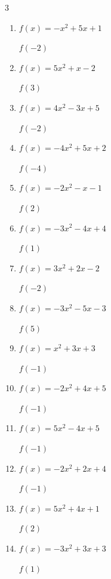 \begin{multicols}{3}
\begin{enumerate}
  \item $f(x)=-x^{2}+5x+1$

$f(-2)$
        \phantom{$= -13$}

  \item $f(x)=5x^{2}+x-2$

$f(3)$
        \phantom{$= 46$}

\columnbreak %

\resetques

  \item $f(x)=4x^{2}-3x+5$

$f(-2)$
        \phantom{$= 27$}

  \item $f(x)=-4x^{2}+5x+2$

$f(-4)$
        \phantom{$= -82$}

  \item $f(x)=-2x^{2}-x-1$

$f(2)$
        \phantom{$= -11$}

  \item $f(x)=-3x^{2}-4x+4$

$f(1)$
        \phantom{$= -3$}

  \item $f(x)=3x^{2}+2x-2$

$f(-2)$
        \phantom{$= 6$}

  \item $f(x)=-3x^{2}-5x-3$

$f(5)$
        \phantom{$= -103$}

  \item $f(x)=x^{2}+3x+3$

$f(-1)$
        \phantom{$= 1$}

  \item $f(x)=-2x^{2}+4x+5$

$f(-1)$
        \phantom{$= -1$}

  \item $f(x)=5x^{2}-4x+5$

$f(-1)$
        \phantom{$= 14$}

  \item $f(x)=-2x^{2}+2x+4$

$f(-1)$
        \phantom{$= 0$}

  \item $f(x)=5x^{2}+4x+1$

$f(2)$
        \phantom{$= 29$}

  \item $f(x)=-3x^{2}+3x+3$

$f(1)$
        \phantom{$= 3$}


\end{enumerate}
\end{multicols}
